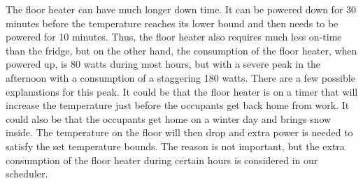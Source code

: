 The floor heater can have much longer down time. It can be powered down for 30 minutes before the temperature reaches its lower bound and then needs to be powered for 10 minutes. Thus, the floor heater also requires much less on-time than the fridge, but on the other hand, the consumption of the floor heater, when powered up, is 80 watts during most hours, but with a severe peak in the afternoon with a consumption of a staggering 180 watts. There are a few possible explanations for this peak. It could be that the floor heater is on a timer that will increase the temperature just before the occupants get back home from work. It could also be that the occupants get home on a winter day and brings snow inside. The temperature on the floor will then drop and extra power is needed to satisfy the set temperature bounds. The reason is not important, but the extra consumption of the floor heater during certain hours is considered in our scheduler.


